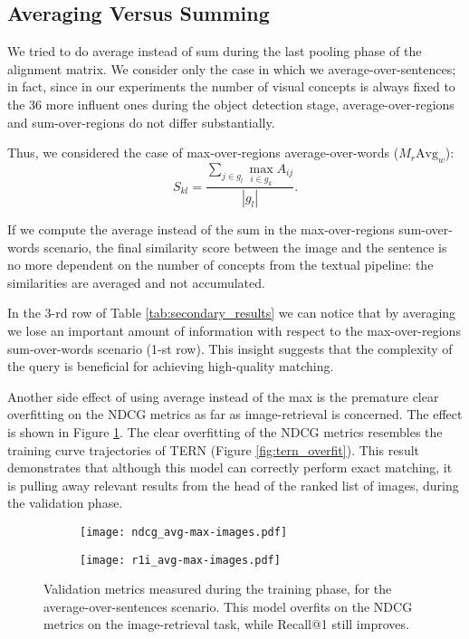 \documentclass[acmsmall]{acmart}
\newcommand{\majorrevised}[1]{#1}
\begin{document}
\subsection{Averaging Versus Summing}
We tried to do average instead of sum during the last pooling phase of the alignment matrix.
We consider only the case in which we average-over-sentences; in fact, since in our experiments the number of visual concepts is always fixed to the 36 more influent ones during the object detection stage, average-over-regions and sum-over-regions do not differ substantially.

Thus, we considered the case of max-over-regions average-over-words ($M_{r}\text{Avg}_{w}$):
\begin{equation}
    S_{kl} = \frac{\sum_{j \in g_l}\max_{i \in g_k} {A_{ij}}}{|g_l|}.
\end{equation}

If we compute the average instead of the sum in the max-over-regions sum-over-words scenario, the final similarity score between the image and the sentence is no more dependent on the number of concepts from the textual pipeline: the similarities are averaged and not accumulated.

In the 3-rd row of Table \ref{tab:secondary_results} we can notice that by averaging we lose an important amount of information with respect to the max-over-regions sum-over-words scenario (1-st row). This insight suggests that the complexity of the query is beneficial for achieving high-quality matching. 

Another side effect of using average instead of the max is the premature clear overfitting on the NDCG metrics as far as image-retrieval is concerned. The effect is shown in Figure \ref{fig:overfit}. \majorrevised{The clear overfitting of the NDCG metrics resembles the training curve trajectories of TERN (Figure \ref{fig:tern_overfit})}. This result demonstrates that although this model can correctly perform exact matching, it is pulling away relevant results from the head of the ranked list of images, during the validation phase. 


\begin{figure}[t]
\begin{subfigure}[b]{0.49\textwidth}
\centering
\texttt{[image: ndcg\_avg-max-images.pdf]}
\end{subfigure}
\begin{subfigure}[b]{0.476\textwidth}
\centering
\texttt{[image: r1i\_avg-max-images.pdf]}
\end{subfigure}
\caption{Validation metrics measured during the training phase, for the  average-over-sentences scenario. This model overfits on the NDCG metrics on the image-retrieval task, while Recall@1 still improves.}
\label{fig:overfit}       \end{figure}
\end{document}
